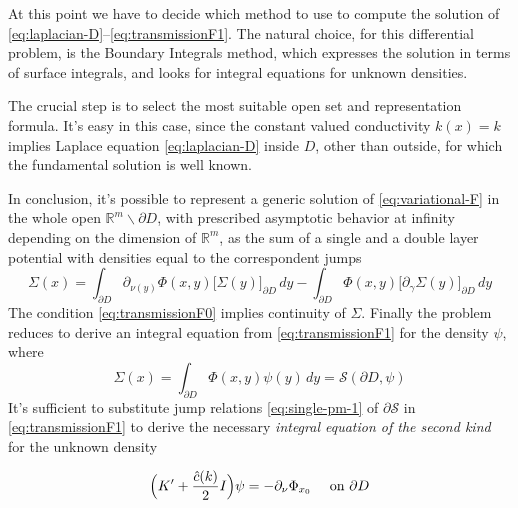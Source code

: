\documentclass[10pt, a4paper, twoside, openright]{book}
\theoremstyle{definition}
\theoremstyle{plain}
\theoremstyle{plain}
\theoremstyle{plain}
\theoremstyle{plain}
\theoremstyle{plain}
\theoremstyle{plain}
\theoremstyle{plain}
\theoremstyle{plain}
\begin{document}
At this point we have to decide which method to use to compute the solution of \eqref{eq:laplacian-D}--\eqref{eq:transmissionF1}. The natural choice, for this differential problem, is the Boundary Integrals method, which expresses the solution in terms of surface integrals, and looks for integral equations for unknown densities. 
\par
The crucial step is to select the most suitable open set and representation formula. It's easy in this case, since the constant valued conductivity $k(x)=k$ implies Laplace equation \eqref{eq:laplacian-D} inside $D$, other than outside, for which the fundamental solution is well known.
\par
In conclusion, it's possible to represent a generic solution of \eqref{eq:variational-F} in the whole open $\mathbb{R}^m\backslash\partial D$, with prescribed asymptotic behavior at infinity depending on the dimension of $\mathbb{R}^m$, as the sum of a single and a double layer potential with densities equal to the correspondent jumps 
\begin{equation}
 \Sigma(x) = \int_{\partial D}\partial_{\nu(y)}\Phi(x,y)\bigl[\Sigma(y)\bigr]_{\partial D}\,dy-\int_{\partial D}\Phi(x,y)\bigl[\partial_\gamma \Sigma(y)\bigr]_{\partial D}\,dy
\end{equation}
The condition \eqref{eq:transmissionF0} implies continuity of $\Sigma$. Finally the problem reduces to derive an integral equation from \eqref{eq:transmissionF1} for the density $\psi$, where
\begin{equation}
 \Sigma(x)=\int_{\partial D}\Phi(x,y)\psi(y)\,dy = \mathcal{S}(\partial D, \psi)
\end{equation}
It's sufficient to substitute jump relations \eqref{eq:single-pm-1} of $\partial\mathcal{S}$ in \eqref{eq:transmissionF1} to derive the necessary \emph{integral equation of the second kind} for the unknown density
\begin{center}
\begin{equation}
 \label{eq:eq-psi-ck}
 \Bigl(K' + \frac{\hat{c}(k)}{2} I\Bigr)\psi = -\partial_\nu \Phi_{x_0}\quad\textup{ on }\partial D
\end{equation}
\end{center}
\end{document}
